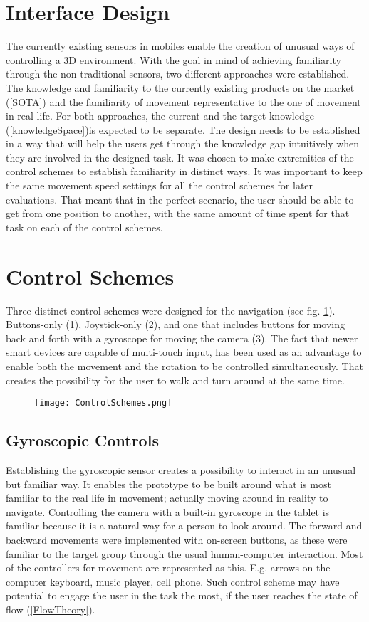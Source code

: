 \section{Interface Design}
The currently existing sensors in mobiles enable the creation of unusual ways of controlling a 3D environment. With the goal in mind of achieving familiarity through the non-traditional sensors, two different approaches were established. The knowledge and familiarity to the currently existing products on the market (\ref{SOTA}) and the familiarity of movement representative to the one of movement in real life. For both approaches, the current and the target knowledge (\ref{knowledgeSpace})is expected to be separate. The design needs to be established in a way that will help the users get through the knowledge gap intuitively when they are involved in the designed task. It was chosen to make extremities of the control schemes to establish familiarity in distinct ways. It was important to keep the same movement speed settings for all the control schemes for later evaluations. That meant that in the perfect scenario, the user should be able to get from one position to another, with the same amount of time spent for that task on each of the control schemes.

\section{Control Schemes}
Three distinct control schemes were designed for the navigation (see fig. \ref{fig:ControlSchemes}). Buttons-only (1), Joystick-only (2), and one that includes buttons for moving back and forth with a gyroscope for moving the camera (3). The fact that newer smart devices are capable of multi-touch input, has been used as an advantage to enable both the movement and the rotation to be controlled simultaneously. That creates the possibility for the user to walk and turn around at the same time.

\begin{figure}[H]
\label{fig:ControlSchemes}
\centering
  \texttt{[image: ControlSchemes.png]}
\end{figure}

\subsection{Gyroscopic Controls}
Establishing the gyroscopic sensor creates a possibility to interact in an unusual but familiar way. It enables the prototype to be built around what is most familiar to the real life in movement; actually moving around in reality to navigate.
Controlling the camera with a built-in gyroscope in the tablet is familiar because it is a natural way for a person to look around. The forward and backward movements were implemented with on-screen buttons, as these were familiar to the target group through the usual human-computer interaction. Most of the controllers for movement are represented as this. E.g. arrows on the computer keyboard, music player, cell phone.
Such control scheme may have potential to engage the user in the task the most, if the user reaches the state of flow (\ref{FlowTheory}). 

